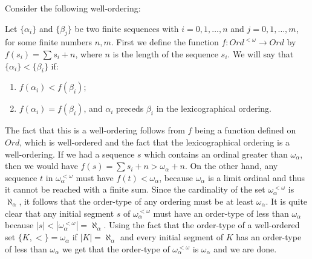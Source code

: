 \begin{solution}
  Consider the following well-ordering:

  Let $\{\alpha_i\}$ and $\{\beta_j\}$ be two finite sequences with $i = 0, 1, \ldots, n$ and $j = 0, 1, \ldots, m$, for some finite numbers $n, m$.
  First we define the function $f : Ord^{<\omega} \to Ord$ by $f(s_i) = \sum s_i + n$, where $n$ is the length of the sequence $s_i$.
  We will say that $\{\alpha_i\} < \{\beta_i\}$ if:
  \begin{enumerate}[label=(\alph*)]
    \item $f(\alpha_i) < f(\beta_i)$;
    \item $f(\alpha_i) = f(\beta_i)$, and $\alpha_i$ preceds $\beta_i$ in the lexicographical ordering.
  \end{enumerate}

  The fact that this is a well-ordering follows from $f$ being a function defined on $Ord$, which is well-ordered and the fact that the lexicographical ordering is a well-ordering.
  If we had a sequence $s$ which contains an ordinal greater than $\omega_{\alpha}$, then we would have $f(s) = \sum s_i + n > \omega_{\alpha} + n$.
  On the other hand, any sequence $t$ in $\omega_{\alpha}^{<\omega}$ must have $f(t) < \omega_{\alpha}$, because $\omega_{\alpha}$ is a limit ordinal and thus it cannot be reached with a finite sum.
  Since the cardinality of the set $\omega_{\alpha}^{<\omega}$ is $\aleph_{\alpha}$, it follows that the order-type of any ordering must be at least $\omega_{\alpha}$.
  It is quite clear that any initial segment $s$ of $\omega_{\alpha}^{<\omega}$ must have an order-type of less than $\omega_{\alpha}$ because $|s| < |\omega_{\alpha}^{<\omega}| = \aleph_{\alpha}$.
  Using the fact that the order-type of a well-ordered set $\{K, <\} = \omega_{\alpha}$ if $|K| = \aleph_{\alpha}$ and every initial segment of $K$ has an order-type of less than $\omega_{\alpha}$ we get that the order-type of $\omega_{\alpha}^{<\omega}$ is $\omega_{\alpha}$ and we are done.
\end{solution}
